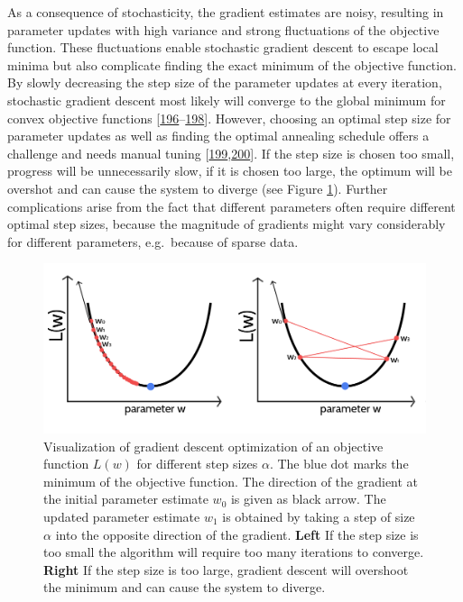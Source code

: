 \documentclass[11pt,a4paper,twoside]{book}
\theoremstyle{definition}
\theoremstyle{definition}
\theoremstyle{remark}
\begin{document}
As a consequence of stochasticity, the gradient estimates are noisy,
resulting in parameter updates with high variance and strong
fluctuations of the objective function. These fluctuations enable
stochastic gradient descent to escape local minima but also complicate
finding the exact minimum of the objective function. By slowly
decreasing the step size of the parameter updates at every iteration,
stochastic gradient descent most likely will converge to the global
minimum for convex objective functions
{[}\protect\hyperlink{ref-Ruder2017}{196}--\protect\hyperlink{ref-Bottou2010}{198}{]}.
However, choosing an optimal step size for parameter updates as well as
finding the optimal annealing schedule offers a challenge and needs
manual tuning
{[}\protect\hyperlink{ref-Schaul2013}{199},\protect\hyperlink{ref-Zeiler2012}{200}{]}.
If the step size is chosen too small, progress will be unnecessarily
slow, if it is chosen too large, the optimum will be overshot and can
cause the system to diverge (see Figure
\ref{fig:gd-learning-rate-intro}). Further complications arise from the
fact that different parameters often require different optimal step
sizes, because the magnitude of gradients might vary considerably for
different parameters, e.g.~because of sparse data.












\begin{figure}

{\centering \includegraphics[width=0.8\linewidth]{img/full_likelihood/intro} 

}

\caption{Visualization of gradient descent
optimization of an objective function \(L(w)\) for different step sizes
\(\alpha\). The blue dot marks the minimum of the objective function.
The direction of the gradient at the initial parameter estimate \(w_0\)
is given as black arrow. The updated parameter estimate \(w_1\) is
obtained by taking a step of size \(\alpha\) into the opposite direction
of the gradient. \textbf{Left} If the step size is too small the
algorithm will require too many iterations to converge. \textbf{Right}
If the step size is too large, gradient descent will overshoot the
minimum and can cause the system to diverge.}\label{fig:gd-learning-rate-intro}
\end{figure}
\end{document}
